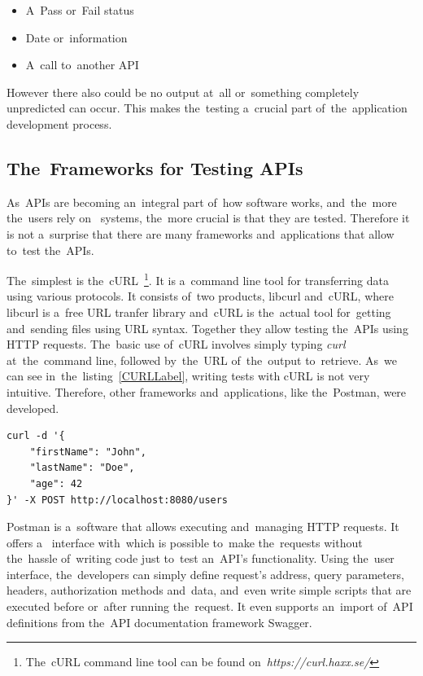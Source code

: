 \begin{itemize}
  \item A~Pass or~Fail status
  \item Date or~information
  \item A~call to~another API
\end{itemize}

However there also could be no output at~all or~something completely unpredicted
can occur. This makes the~testing a~crucial part of~the~application development
process.

\subsection{The~Frameworks for Testing APIs}
As~APIs are becoming an~integral part of~how software works, and~the~more
the~users rely on~ systems, the~more crucial is that they are
tested. Therefore it is not a~surprise that there are many frameworks
and~applications that allow to~test the~APIs.

The~simplest is the~cURL~\footnote{The~cURL command line tool can be found
on~\textit{https://curl.haxx.se/}}.
It is a~command line tool for transferring data using various protocols. It
consists of~two products, libcurl and~cURL, where libcurl is a~free  URL tranfer library and~cURL is
the~actual tool for~getting and~sending files using URL syntax. Together they
allow testing the~APIs using HTTP requests. The~basic use of~cURL involves
simply typing \textit{curl} at~the~command line, followed by~the~URL
of~the~output to~retrieve. As~we can see in~the~listing~\ref{CURLLabel}, writing tests with cURL is not
very intuitive. Therefore, other frameworks and~applications, like the~Postman,
were developed.

\vspace{2mm}
\begin{lstlisting}[caption=An~example of~POST request that creates new user
on~the~server using cURL.,label=CURLLabel,language=XML]
curl -d '{
	"firstName": "John",
	"lastName": "Doe",
	"age": 42
}' -X POST http://localhost:8080/users
\end{lstlisting}

Postman is a~software that allows executing and~managing HTTP requests. It
offers a~ interface with~which is possible to~make
the~requests without the~hassle of~writing code just to~test an~API's
functionality. Using the~user interface, the~developers can simply define
request's address, query parameters, headers, authorization methods and~data,
and~even write simple scripts that are executed before or~after running
the~request. It even supports an~import of~API definitions from the~API
documentation framework Swagger.

